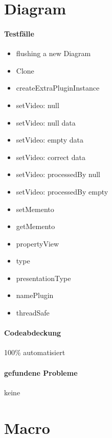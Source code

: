 \section{Diagram}
\paragraph*{Testfälle}
\begin{itemize}
\item flushing a new Diagram
\item Clone
\item createExtraPluginInstance
\item setVideo: null
\item setVideo: null data
\item setVideo: empty data
\item setVideo: correct data
\item setVideo: processedBy null
\item setVideo: processedBy empty
\item setMemento
\item getMemento
\item propertyView
\item type
\item presentationType
\item namePlugin
\item threadSafe
\end{itemize}
\paragraph*{Codeabdeckung}
100\% automatisiert
\paragraph*{gefundene Probleme}
keine



\section{Macro}
